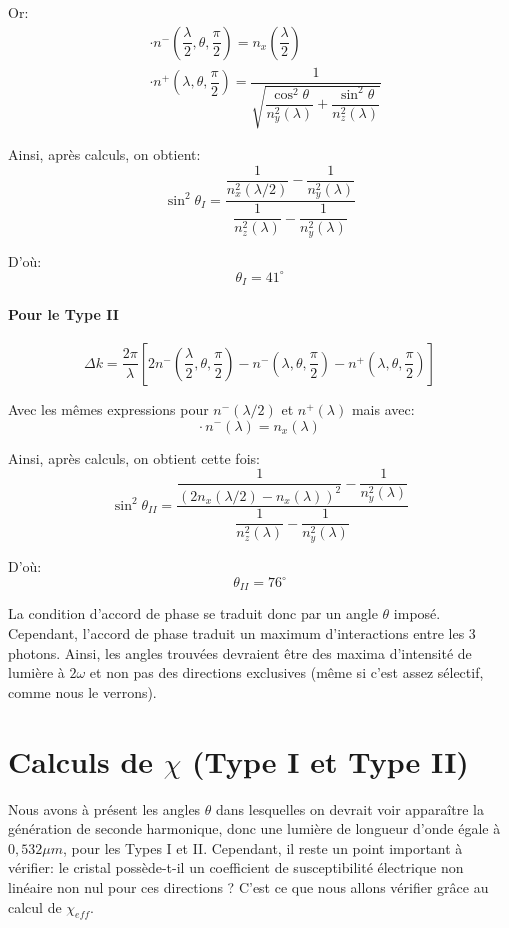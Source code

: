 \documentclass[a4paper,11pt]{report}
\begin{document}
Or: 
\begin{align*}
    &\cdot n^-\left(\dfrac{\lambda}{2},\theta,\dfrac{\pi}{2}\right)=n_x\left(\dfrac{\lambda}{2}\right)\\
    &\cdot n^+\left(\lambda,\theta,\dfrac{\pi}{2}\right)=\dfrac{1}{\sqrt{\dfrac{\cos^2\theta}{n_y^2(\lambda)}+\dfrac{\sin^2\theta}{n_z^2(\lambda)}}}
\end{align*}

Ainsi, après calculs, on obtient: 
\[\sin^2\theta_{I}=\dfrac{\dfrac{1}{n_x^2(\lambda/2)}-\dfrac{1}{n_y^2(\lambda)}}{\dfrac{1}{n_z^2(\lambda)}-\dfrac{1}{n_y^2(\lambda)}}\]

D'où: 
\[\theta_{I}=41^{\circ}\]

\paragraph{Pour le Type II}
\[\Delta k=\dfrac{2\pi}{\lambda}\left[2n^-\left(\dfrac{\lambda}{2},\theta,\dfrac{\pi}{2}\right)-n^-\left(\lambda,\theta,\dfrac{\pi}{2}\right)-n^+\left(\lambda,\theta,\dfrac{\pi}{2}\right)\right]\]

Avec les mêmes expressions pour $n^-(\lambda/2)$ et $n^+(\lambda)$ mais avec:
\[\cdot\,n^-(\lambda)=n_x(\lambda)\]

Ainsi, après calculs, on obtient cette fois:
\[\sin^2\theta_{II}=\dfrac{\dfrac{1}{(2n_x(\lambda/2)-n_x(\lambda))^2}-\dfrac{1}{n_y^2(\lambda)}}{\dfrac{1}{n_z^2(\lambda)}-\dfrac{1}{n_y^2(\lambda)}}\]

D'où:
\[\theta_{II}=76^{\circ}\]

La condition d'accord de phase se traduit donc par un angle $\theta$ imposé. Cependant, l'accord de phase traduit un maximum d'interactions entre les 3 photons. Ainsi, les angles trouvées devraient être des maxima d'intensité de lumière à $2\omega$ et non pas des directions exclusives (même si c'est assez sélectif, comme nous le verrons).

\section{Calculs de $\chi$ (Type I et Type II)}

Nous avons à présent les angles $\theta$ dans lesquelles on devrait voir apparaître la génération de seconde harmonique, donc une lumière de longueur d'onde égale à $0,532\mu m$, pour les Types I et II. Cependant, il reste un point important à vérifier: le  cristal possède-t-il un coefficient de susceptibilité électrique non linéaire non nul pour ces directions ? C'est ce que nous allons vérifier grâce au calcul de $\chi_{eff}$.
\end{document}
